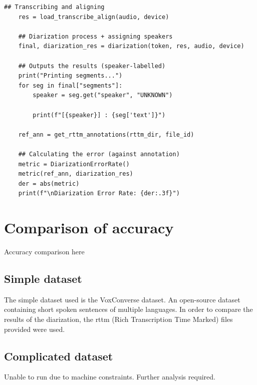 \documentclass{article}
\begin{document}
\begin{lstlisting}[style=pythonstyle, caption={LLM-backed diarization}]
    ## Transcribing and aligning
    res = load_transcribe_align(audio, device)

    ## Diarization process + assigning speakers
    final, diarization_res = diarization(token, res, audio, device)

    ## Outputs the results (speaker-labelled)
    print("Printing segments...")
    for seg in final["segments"]:
        speaker = seg.get("speaker", "UNKNOWN")

        print(f"[{speaker}] : {seg['text']}")

    ref_ann = get_rttm_annotations(rttm_dir, file_id)

    ## Calculating the error (against annotation)
    metric = DiarizationErrorRate()
    metric(ref_ann, diarization_res)
    der = abs(metric)
    print(f"\nDiarization Error Rate: {der:.3f}")
\end{lstlisting}


\section{Comparison of accuracy}
Accuracy comparison here


\subsection{Simple dataset}
The simple dataset used is the VoxConverse dataset. An open-source dataset containing short spoken sentences of multiple languages.
In order to compare the results of the diarization, the rttm (Rich Transcription Time Marked) files provided were used.


\subsection{Complicated dataset}
Unable to run due to machine constraints. Further analysis required.

\printglossaries
\end{document}
